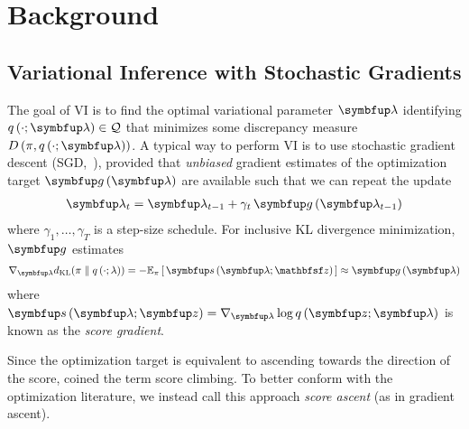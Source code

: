 
\vspace{-0.1in}
\section{Background}
\vspace{-0.05in}
\subsection{Variational Inference with Stochastic Gradients}\label{section:ivi_previous}
\vspace{-0.05in}
The goal of VI is to find the optimal variational parameter \(\vlambda\) identifying \(q\left(\cdot; \vlambda\right) \in \mathcal{Q}\) that minimizes some discrepancy measure \(D\left(\pi, q\left(\cdot; \vlambda\right)\right)\).
A typical way to perform VI is to use stochastic gradient descent (SGD,~\citealt{robbins_stochastic_1951}), provided that \textit{unbiased} gradient estimates of the optimization target \(\vg\,(\vlambda)\) are available such that we can repeat the update
{%
\begin{align*}
  \vlambda_{t} = \vlambda_{t-1} + \gamma_{t} \, \vg\left(\vlambda_{t-1}\right)
\end{align*}
}%
where \(\gamma_1, \ldots, \gamma_T\) is a step-size schedule.
For inclusive KL divergence minimization, \(\vg\) estimates
%
{%
\begin{align*}
  \nabla_{\vlambda} \DKL{\pi}{q\left(\cdot; \lambda\right)}
  = -\Esub{\pi}{ \vs\,(\vlambda; \rvvz) } 
  \approx \vg\left(\vlambda\right)
\end{align*}
}%
%
where \(\vs\,(\vlambda;\vz) = \nabla_{\vlambda} \log q\,(\vz; \vlambda)\) is known as the \textit{score gradient}.

Since the optimization target is equivalent to ascending towards the direction of the score, \citet{NEURIPS2020_b2070693} coined the term score climbing.
To better conform with the optimization literature, we instead call this approach \textit{score ascent} (as in gradient ascent).

